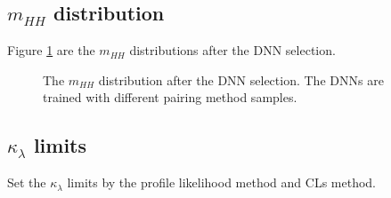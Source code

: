 \documentclass[12pt]{article}
\begin{document}
	\subsection{\texorpdfstring{$m_{HH}$}{mhh} distribution}%
	\label{sub:mhh_distribution}
		Figure \ref{fig:mhh_distribution_DNN} are the $m_{HH}$ distributions after the DNN selection.
		\begin{figure}[htpb]
			\centering
			\caption{The $m_{H H}$ distribution after the DNN selection. The DNNs are trained with different pairing method samples.}
			\label{fig:mhh_distribution_DNN}
		\end{figure}
	\subsection{\texorpdfstring{$\kappa_\lambda$}{kappa} limits}%
	\label{sub:kappa_limits}
		Set the $\kappa_\lambda$ limits by the profile likelihood method and CLs method.
\end{document}
